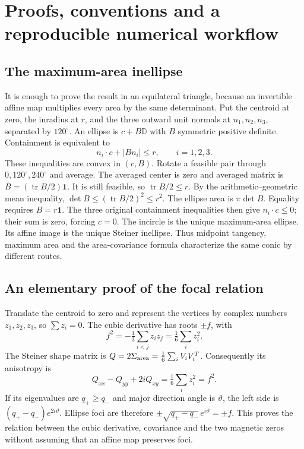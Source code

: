 \documentclass[11pt,oneside,openany]{book}
\newcommand{\tr}{\operatorname{tr}}\newcommand{\dd}{\,\mathrm d}\newcommand{\R}{\mathbb R}
\begin{document}
\appendix

\chapter{Proofs, conventions and a reproducible numerical workflow}
\label{app:proofs}

\section{The maximum-area inellipse}
It is enough to prove the result in an equilateral triangle, because
an invertible affine map multiplies every area by the same determinant.
Put the centroid at zero, the inradius at $r$, and the three outward
unit normals at $n_1,n_2,n_3$, separated by $120^\circ$.
An ellipse is $c+B\mathbb D$ with $B$ symmetric positive definite.
Containment is equivalent to
\[
n_i\cdot c+|Bn_i|\le r,\qquad i=1,2,3.
\]
These inequalities are convex in $(c,B)$. Rotate a feasible pair
through $0,120^\circ,240^\circ$ and average. The averaged center is
zero and averaged matrix is $\overline B=(\tr B/2)\mathbf1$.
It is still feasible, so $\tr B/2\le r$.
By the arithmetic--geometric mean inequality,
$\det B\le(\tr B/2)^2\le r^2$. The ellipse area is $\pi\det B$.
Equality requires $B=r\mathbf1$. The three original containment
inequalities then give $n_i\cdot c\le0$; their sum is zero, forcing
$c=0$. The incircle is the unique maximum-area ellipse.
Its affine image is the unique Steiner inellipse.
Thus midpoint tangency, maximum area and the area-covariance formula
characterize the same conic by different routes.

\section{An elementary proof of the focal relation}
Translate the centroid to zero and represent the vertices by complex
numbers $z_1,z_2,z_3$, so $\sum z_i=0$.
The cubic derivative has roots $\pm f$, with
\[
f^2=-\tfrac13\sum_{i<j}z_i z_j
=\tfrac16\sum_i z_i^2.
\]
The Steiner shape matrix is
$Q=2\Sigma_{\rm area}=\frac16\sum_i V_iV_i^T$.
Consequently its anisotropy is
\[
Q_{xx}-Q_{yy}+2iQ_{xy}=\tfrac16\sum_i z_i^2=f^2.
\]
If its eigenvalues are $q_+\ge q_-$ and major direction angle is
$\vartheta$, the left side is
$(q_+-q_-)e^{2i\vartheta}$.
Ellipse foci are therefore
$\pm\sqrt{q_+-q_-}\,e^{i\vartheta}=\pm f$.
This proves the relation between the cubic derivative, covariance
and the two magnetic zeros without assuming that an affine map
preserves foci.
\end{document}
